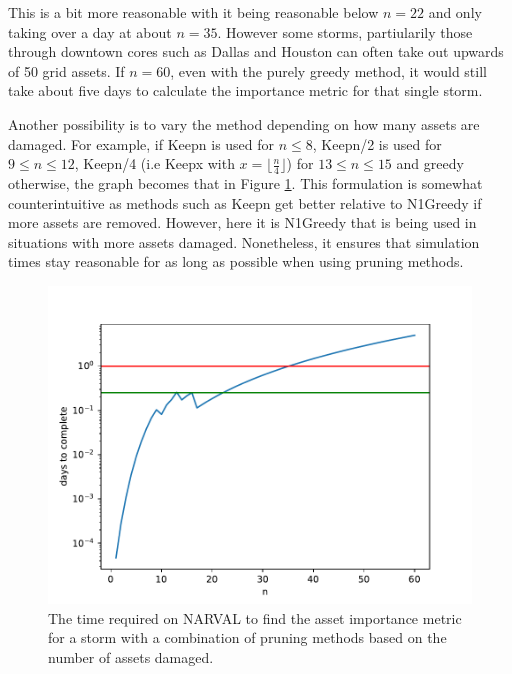\documentclass[12pt]{article}
\begin{document}
This is a bit more reasonable with it being reasonable below $n=22$ and only taking over a day at about $n=35$. However some storms, partiularily those through downtown cores such as Dallas and Houston can often take out upwards of 50 grid assets. If $n=60$, even with the purely greedy method, it would still take about five days to calculate the importance metric for that single storm. \par
Another possibility is to vary the method depending on how many assets are damaged. For example, if Keepn is used for $n\leq8$, Keepn/2 is used for $9 \leq n \leq 12$, Keepn/4 (i.e Keepx  with $x = \lfloor \frac{n}{4} \rfloor$) for $13 \leq n \leq 15$ and greedy otherwise, the graph becomes that in Figure \ref{fig:Keepvariednumsims}. This formulation is somewhat counterintuitive as methods such as Keepn get better relative to N1Greedy if more assets are removed. However, here it is N1Greedy that is being used in situations with more assets damaged. Nonetheless, it ensures that simulation times stay reasonable for as long as possible when using pruning methods.\par


\begin{figure}[ht]
    \centering %
    \includegraphics[width=\textwidth]{Keepvariednumsims.pdf}
    \caption[Time required to find importance metric with various methods]{The time required on NARVAL to find the asset importance metric for a storm with a combination of pruning methods based on the number of assets damaged.}
    \label{fig:Keepvariednumsims}
\end{figure}
\end{document}

